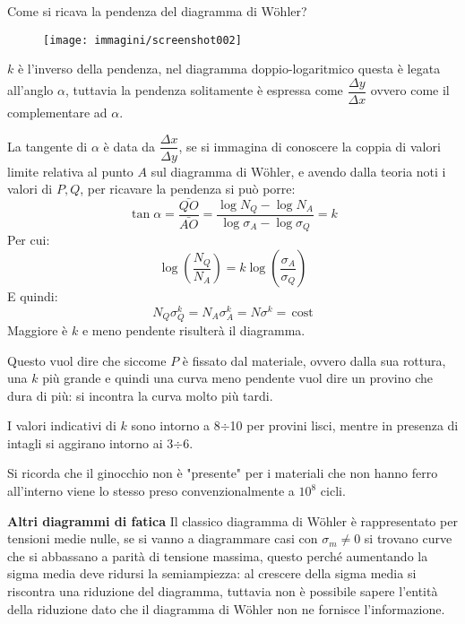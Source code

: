 \documentclass{article}
\begin{document}
\begin{adjustwidth}{2in}{}
			Come si ricava la pendenza del diagramma di Wöhler? 
\begin{figure}[H]
	\centering
	\label{fig:screenshot002}
	\texttt{[image: immagini/screenshot002]}
\end{figure}
			$k$ è l'inverso della pendenza, nel diagramma doppio-logaritmico questa è legata all'anglo $\alpha$, tuttavia la pendenza solitamente è espressa come $\dfrac{\Delta y}{\Delta x}$ ovvero come il complementare ad $\alpha$. 
			
			La tangente di $\alpha$ è data da $\dfrac{\Delta x}{\Delta y}$, se si immagina di conoscere la coppia di valori limite relativa al punto $A$ sul diagramma di Wöhler, e avendo dalla teoria noti i valori di $P, Q$, per ricavare la pendenza si può porre:
			\[\tan\alpha = \dfrac{\bar{QO}}{\bar{AO}} = \dfrac{\log N_Q - \log N_A}{\log\sigma_A - \log\sigma_Q} = k\]
			Per cui:
			\[\log\left(\dfrac{N_Q}{N_A}\right) = k\log\left(\dfrac{\sigma_A}{\sigma_Q}\right)\]
			E quindi:
			\[N_Q\sigma_Q^k = N_A\sigma_A^k = N\sigma^k = \, \text{cost}\]
			Maggiore è $k$ e meno pendente risulterà il diagramma. \newline 
			
			Questo vuol dire che siccome $P$ è fissato dal materiale, ovvero dalla sua rottura, una $k$ più grande e quindi una curva meno pendente vuol dire un provino che dura di più: si incontra la curva molto più tardi. \newline 
			
			I valori indicativi di $k$ sono intorno a 8$\div$10 per provini lisci, mentre in presenza di intagli si aggirano intorno ai 3$\div$6. \newline
			
			Si ricorda che il ginocchio non è "presente" per i materiali che non hanno ferro all'interno viene lo stesso preso convenzionalmente a $10^8$ cicli. \newline
			
			\textbf{{\Large Altri diagrammi di fatica}} \mbox{} \newline			
			Il classico diagramma di Wöhler è rappresentato per tensioni medie nulle, se si vanno a diagrammare casi con $\sigma_m\ne0$ si trovano curve che si abbassano a parità di tensione massima, questo perché aumentando la sigma media deve ridursi la semiampiezza: al crescere della sigma media si riscontra una riduzione del diagramma, tuttavia non è possibile sapere l'entità della riduzione dato che  il diagramma di Wöhler non ne fornisce l'informazione. \newline 
			

\end{adjustwidth}
\end{document}

